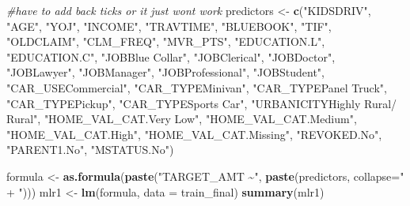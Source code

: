 \documentclass[
]{article}
\newenvironment{Shaded}{\begin{snugshade}}{\end{snugshade}}
\newcommand{\AttributeTok}[1]{\textcolor[rgb]{0.13,0.29,0.53}{#1}}
\newcommand{\CommentTok}[1]{\textcolor[rgb]{0.56,0.35,0.01}{\textit{#1}}}
\newcommand{\FunctionTok}[1]{\textcolor[rgb]{0.13,0.29,0.53}{\textbf{#1}}}
\newcommand{\NormalTok}[1]{#1}
\newcommand{\OtherTok}[1]{\textcolor[rgb]{0.56,0.35,0.01}{#1}}
\newcommand{\StringTok}[1]{\textcolor[rgb]{0.31,0.60,0.02}{#1}}
\begin{document}
\begin{Shaded}
\begin{Highlighting}[]
\CommentTok{\#have to add back ticks or it just won\textquotesingle{}t work}
\NormalTok{predictors }\OtherTok{\textless{}{-}} \FunctionTok{c}\NormalTok{(}\StringTok{"KIDSDRIV"}\NormalTok{, }\StringTok{"AGE"}\NormalTok{, }\StringTok{"YOJ"}\NormalTok{, }\StringTok{"INCOME"}\NormalTok{, }\StringTok{"TRAVTIME"}\NormalTok{, }\StringTok{"BLUEBOOK"}\NormalTok{, }\StringTok{"TIF"}\NormalTok{,}
                \StringTok{"OLDCLAIM"}\NormalTok{, }\StringTok{"CLM\_FREQ"}\NormalTok{, }\StringTok{"MVR\_PTS"}\NormalTok{, }\StringTok{"EDUCATION.L"}\NormalTok{, }\StringTok{"EDUCATION.C"}\NormalTok{,}
                \StringTok{"\textasciigrave{}JOBBlue Collar\textasciigrave{}"}\NormalTok{, }\StringTok{"JOBClerical"}\NormalTok{, }\StringTok{"JOBDoctor"}\NormalTok{, }\StringTok{"JOBLawyer"}\NormalTok{,}
                \StringTok{"JOBManager"}\NormalTok{, }\StringTok{"JOBProfessional"}\NormalTok{, }\StringTok{"JOBStudent"}\NormalTok{, }\StringTok{"CAR\_USECommercial"}\NormalTok{,}
                \StringTok{"CAR\_TYPEMinivan"}\NormalTok{, }\StringTok{"\textasciigrave{}CAR\_TYPEPanel Truck\textasciigrave{}"}\NormalTok{, }\StringTok{"CAR\_TYPEPickup"}\NormalTok{,}
                \StringTok{"\textasciigrave{}CAR\_TYPESports Car\textasciigrave{}"}\NormalTok{, }\StringTok{"\textasciigrave{}URBANICITYHighly Rural/ Rural\textasciigrave{}"}\NormalTok{,}
                \StringTok{"\textasciigrave{}HOME\_VAL\_CAT.Very Low\textasciigrave{}"}\NormalTok{, }\StringTok{"HOME\_VAL\_CAT.Medium"}\NormalTok{, }\StringTok{"HOME\_VAL\_CAT.High"}\NormalTok{,}
                \StringTok{"HOME\_VAL\_CAT.Missing"}\NormalTok{, }\StringTok{"REVOKED.No"}\NormalTok{, }\StringTok{"PARENT1.No"}\NormalTok{, }\StringTok{"MSTATUS.No"}\NormalTok{)}

\NormalTok{formula }\OtherTok{\textless{}{-}} \FunctionTok{as.formula}\NormalTok{(}\FunctionTok{paste}\NormalTok{(}\StringTok{"TARGET\_AMT \textasciitilde{}"}\NormalTok{, }\FunctionTok{paste}\NormalTok{(predictors, }\AttributeTok{collapse=}\StringTok{" + "}\NormalTok{)))}
\NormalTok{mlr1 }\OtherTok{\textless{}{-}} \FunctionTok{lm}\NormalTok{(formula, }\AttributeTok{data =}\NormalTok{ train\_final)}
\FunctionTok{summary}\NormalTok{(mlr1)}
\end{Highlighting}
\end{Shaded}
\end{document}
